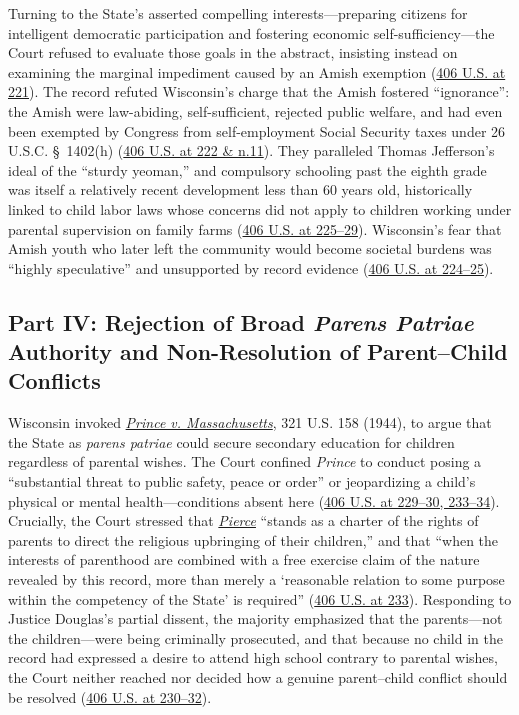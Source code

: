\documentclass[12pt]{article}
\begin{document}
Turning to the State's asserted compelling interests---preparing citizens for intelligent democratic participation and fostering economic self-sufficiency---the Court refused to evaluate those goals in the abstract, insisting instead on examining the marginal impediment caused by an Amish exemption (\href{https://supreme.justia.com/cases/federal/us/406/205/}{406 U.S. at 221}). The record refuted Wisconsin's charge that the Amish fostered ``ignorance'': the Amish were law-abiding, self-sufficient, rejected public welfare, and had even been exempted by Congress from self-employment Social Security taxes under 26 U.S.C. \S~1402(h) (\href{https://supreme.justia.com/cases/federal/us/406/205/}{406 U.S. at 222 \& n.11}). They paralleled Thomas Jefferson's ideal of the ``sturdy yeoman,'' and compulsory schooling past the eighth grade was itself a relatively recent development less than 60 years old, historically linked to child labor laws whose concerns did not apply to children working under parental supervision on family farms (\href{https://supreme.justia.com/cases/federal/us/406/205/}{406 U.S. at 225--29}). Wisconsin's fear that Amish youth who later left the community would become societal burdens was ``highly speculative'' and unsupported by record evidence (\href{https://supreme.justia.com/cases/federal/us/406/205/}{406 U.S. at 224--25}).

\subsection{Part IV: Rejection of Broad \emph{Parens Patriae} Authority and Non-Resolution of Parent--Child Conflicts}

Wisconsin invoked \href{https://supreme.justia.com/cases/federal/us/321/158/}{\emph{Prince v. Massachusetts}}, 321 U.S. 158 (1944), to argue that the State as \emph{parens patriae} could secure secondary education for children regardless of parental wishes. The Court confined \emph{Prince} to conduct posing a ``substantial threat to public safety, peace or order'' or jeopardizing a child's physical or mental health---conditions absent here (\href{https://supreme.justia.com/cases/federal/us/406/205/}{406 U.S. at 229--30, 233--34}). Crucially, the Court stressed that \href{https://supreme.justia.com/cases/federal/us/268/510/}{\emph{Pierce}} ``stands as a charter of the rights of parents to direct the religious upbringing of their children,'' and that ``when the interests of parenthood are combined with a free exercise claim of the nature revealed by this record, more than merely a `reasonable relation to some purpose within the competency of the State' is required'' (\href{https://supreme.justia.com/cases/federal/us/406/205/}{406 U.S. at 233}). Responding to Justice Douglas's partial dissent, the majority emphasized that the parents---not the children---were being criminally prosecuted, and that because no child in the record had expressed a desire to attend high school contrary to parental wishes, the Court neither reached nor decided how a genuine parent--child conflict should be resolved (\href{https://supreme.justia.com/cases/federal/us/406/205/}{406 U.S. at 230--32}).
\end{document}
